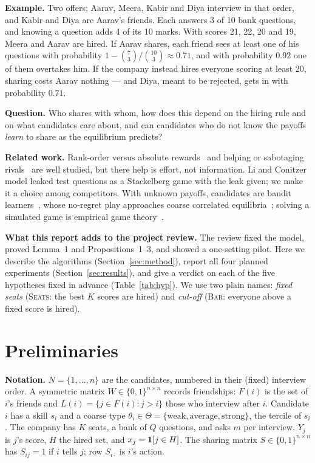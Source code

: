 \documentclass[10pt]{article}
\theoremstyle{plain}
\theoremstyle{definition}\newtheorem{definition}{Definition}
\newcommand{\seats}{\textsc{Seats}}\newcommand{\barr}{\textsc{Bar}}
\begin{document}
\textbf{Example.} Two offers; Aarav, Meera, Kabir and Diya interview in that order, and Kabir and Diya are Aarav's friends. Each
answers 3 of 10 bank questions, and knowing a question adds 4 of its 10 marks. With scores 21, 22, 20 and 19, Meera and Aarav are
hired. If Aarav shares, each friend sees at least one of his questions with probability $1-\binom{7}{3}/\binom{10}{3}\approx 0.71$,
and with probability $0.92$ one of them overtakes him. If the company instead hires everyone scoring at least 20, sharing costs
Aarav nothing --- and Diya, meant to be rejected, gets in with probability $0.71$.

\textbf{Question.} Who shares with whom, how does this depend on the hiring rule and on what candidates care about, and can
candidates who do not know the payoffs \emph{learn} to share as the equilibrium predicts?

\textbf{Related work.} Rank-order versus absolute rewards~\cite{lazear} and helping or sabotaging rivals~\cite{krakel} are well
studied, but there help is effort, not information. Li and Conitzer~\cite{li} model leaked test questions as a Stackelberg game with
the leak given; we make it a choice among competitors. With unknown payoffs, candidates are bandit learners~\cite{ucb,exp3,thompson},
whose no-regret play approaches coarse correlated equilibria~\cite{hart}; solving a simulated game is empirical game theory~\cite{wellman}.

\textbf{What this report adds to the project review.} The review fixed the model, proved Lemma~1 and Propositions~1--3, and showed a
one-setting pilot. Here we describe the algorithms (Section~\ref{sec:method}), report all four planned experiments (Section~\ref{sec:results}), and give a verdict on each of the five
hypotheses fixed in advance (Table~\ref{tab:hyp}).
We use two plain names: \emph{fixed seats} (\seats: the best $K$ scores are hired) and \emph{cut-off} (\barr: everyone above a fixed score is hired).

\section{Preliminaries}
\textbf{Notation.} $N=\{1,\dots,n\}$ are the candidates, numbered in their (fixed) interview order. A symmetric matrix
$W\in\{0,1\}^{n\times n}$ records friendships: $F(i)$ is the set of $i$'s friends and $L(i)=\{j\in F(i): j>i\}$ those who interview
after $i$. Candidate $i$ has a skill $s_i$ and a coarse type $\theta_i\in\Theta=\{\text{weak},\text{average},\text{strong}\}$, the
tercile of $s_i$. The company has $K$ seats, a bank of $Q$ questions, and asks $m$ per interview. $Y_j$ is $j$'s score, $H$ the hired
set, and $x_j=\mathbf{1}[j\in H]$. The sharing matrix $S\in\{0,1\}^{n\times n}$ has $S_{ij}=1$ if $i$ tells $j$; row $S_{i\cdot}$ is $i$'s action.
\end{document}
